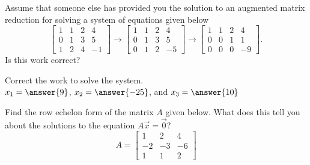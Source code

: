 \documentclass{ximera}
\begin{document}
\begin{exercise}%
    Assume that someone else has provided you the solution to an augmented matrix reduction for solving a system of equations given below
    \begin{equation*}
        \begin{bmatrix}
            1 & 1 & 2 & 4 \\
            0 & 1 & 3 & 5 \\
            1 & 2 & 4 & -1
        \end{bmatrix}  \rightarrow  
        \begin{bmatrix} 
        1 & 1 & 2 & 4 \\ 
        0 & 1 & 3 & 5 \\ 
        0 & 1 & 2 & -5 
        \end{bmatrix} \rightarrow 
        \begin{bmatrix} 
        1 & 1 & 2 & 4 \\ 
        0 & 0 & 1 & 1 \\ 
        0 & 0 & 0 & -9 
        \end{bmatrix}.
    \end{equation*} 
    Is this work correct? 
    \begin{multipleChoice}
    \end{multipleChoice}
    \begin{problem}
        Correct the work to solve the system.\\
        $x_1 = \answer{9}$, $x_2 = \answer{-25}$, and $x_3 = \answer{10}$
    \end{problem}
\end{exercise}

\begin{exercise}
    Find the row echelon form of the matrix $A$ given below. What does this tell you about the solutions to the equation $A\vec{x} = \vec{0}$?
    \begin{equation*}
        A = 
        \begin{bmatrix} 
        1 & 2 & 4 \\ 
        -2 & -3 & -6 \\ 
        1 & 1 & 2 
        \end{bmatrix}
    \end{equation*}
    \begin{multipleChoice}
    \end{multipleChoice}
\end{exercise}
\end{document}
